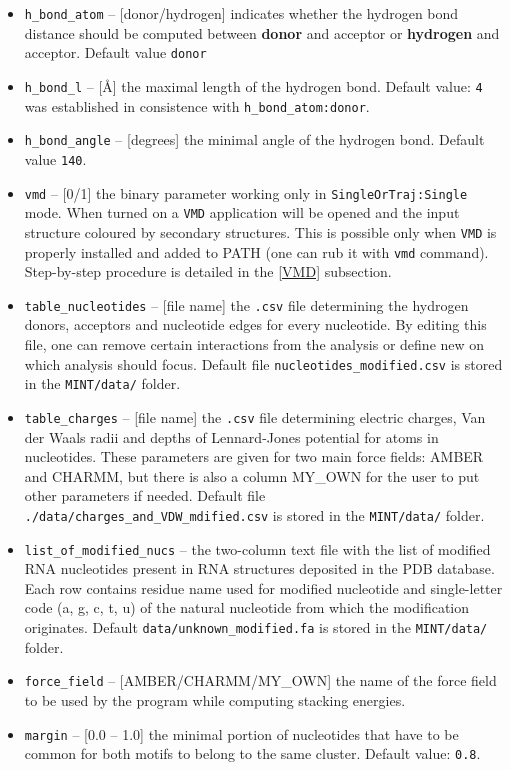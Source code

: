 \documentclass[12pt]{article}
\begin{document}
\begin{itemize}
\item \texttt{h\_bond\_atom} -- [donor/hydrogen] indicates whether the hydrogen bond distance should be computed between \textbf{donor} and acceptor or \textbf{hydrogen}  and acceptor. Default value \texttt{donor} 
\item \texttt{h\_bond\_l} -- [\AA] the maximal length  of the hydrogen bond. Default value: {\tt 4} was established in consistence with \texttt{h\_bond\_atom:donor}.
\item \texttt{h\_bond\_angle}  -- [degrees] the minimal angle of the hydrogen bond. Default value {\tt 140}.
\item {\tt vmd} -- [0/1] the binary parameter working only in {\tt SingleOrTraj:Single} mode. When turned on a {\tt VMD} application will be opened and the input structure coloured by secondary structures. This is possible only when {\tt VMD} is properly installed and added to PATH (one can rub it with {\tt vmd} command). Step-by-step procedure is detailed in the \ref{VMD} subsection.
\item \texttt{table\_nucleotides} -- [file name] the {\tt .csv} file determining the hydrogen donors, acceptors and nucleotide edges for every nucleotide. By editing this file, one can remove certain interactions from the analysis or define new on which analysis should focus. Default file \texttt{nucleotides\_modified.csv} is stored in the \texttt{MINT/data/} folder.
\item \texttt{table\_charges}  -- [file name] the \texttt{.csv} file  determining electric charges, Van der Waals radii and depths of Lennard-Jones potential for atoms in nucleotides. These parameters are given for  two main force fields: AMBER and CHARMM, but there is also a column MY\_OWN for the user to put other parameters if needed.
Default file \texttt{./data/charges\_and\_VDW\_mdified.csv} is stored in the \texttt{MINT/data/} folder.
\item \texttt{list\_of\_modified\_nucs} -- the two-column text file with the list of modified RNA nucleotides present in RNA structures deposited in the PDB database. Each row contains residue name used for modified nucleotide and single-letter code (a, g, c, t, u) of the natural nucleotide from which the modification originates. Default \texttt{data/unknown\_modified.fa} is stored in the \texttt{MINT/data/} folder.
\item \texttt{force\_field} --  [AMBER/CHARMM/MY\_OWN] the name of the force field to be used by the program while computing stacking energies.
\item \texttt{margin} -- [0.0 -- 1.0]  the minimal portion of nucleotides that have to be common for both motifs to belong to the same cluster. Default value: \texttt{0.8}.

\end{itemize}
\end{document}

